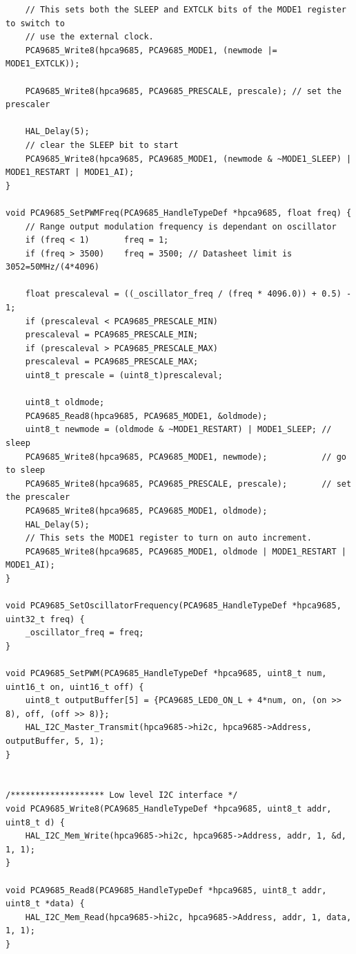 \begin{lstlisting}
    // This sets both the SLEEP and EXTCLK bits of the MODE1 register to switch to
    // use the external clock.
    PCA9685_Write8(hpca9685, PCA9685_MODE1, (newmode |= MODE1_EXTCLK));
    
    PCA9685_Write8(hpca9685, PCA9685_PRESCALE, prescale); // set the prescaler
    
    HAL_Delay(5);
    // clear the SLEEP bit to start
    PCA9685_Write8(hpca9685, PCA9685_MODE1, (newmode & ~MODE1_SLEEP) | MODE1_RESTART | MODE1_AI);
}

void PCA9685_SetPWMFreq(PCA9685_HandleTypeDef *hpca9685, float freq) {
    // Range output modulation frequency is dependant on oscillator
    if (freq < 1)       freq = 1;
    if (freq > 3500)    freq = 3500; // Datasheet limit is 3052=50MHz/(4*4096)

    float prescaleval = ((_oscillator_freq / (freq * 4096.0)) + 0.5) - 1;
    if (prescaleval < PCA9685_PRESCALE_MIN)
    prescaleval = PCA9685_PRESCALE_MIN;
    if (prescaleval > PCA9685_PRESCALE_MAX)
    prescaleval = PCA9685_PRESCALE_MAX;
    uint8_t prescale = (uint8_t)prescaleval;
    
    uint8_t oldmode;
    PCA9685_Read8(hpca9685, PCA9685_MODE1, &oldmode);
    uint8_t newmode = (oldmode & ~MODE1_RESTART) | MODE1_SLEEP; // sleep
    PCA9685_Write8(hpca9685, PCA9685_MODE1, newmode);           // go to sleep
    PCA9685_Write8(hpca9685, PCA9685_PRESCALE, prescale);       // set the prescaler
    PCA9685_Write8(hpca9685, PCA9685_MODE1, oldmode);
    HAL_Delay(5);
    // This sets the MODE1 register to turn on auto increment.
    PCA9685_Write8(hpca9685, PCA9685_MODE1, oldmode | MODE1_RESTART | MODE1_AI);
}

void PCA9685_SetOscillatorFrequency(PCA9685_HandleTypeDef *hpca9685, uint32_t freq) {
    _oscillator_freq = freq;
}

void PCA9685_SetPWM(PCA9685_HandleTypeDef *hpca9685, uint8_t num, uint16_t on, uint16_t off) {
    uint8_t outputBuffer[5] = {PCA9685_LED0_ON_L + 4*num, on, (on >> 8), off, (off >> 8)};
    HAL_I2C_Master_Transmit(hpca9685->hi2c, hpca9685->Address, outputBuffer, 5, 1);
}

            
/******************* Low level I2C interface */
void PCA9685_Write8(PCA9685_HandleTypeDef *hpca9685, uint8_t addr, uint8_t d) {
    HAL_I2C_Mem_Write(hpca9685->hi2c, hpca9685->Address, addr, 1, &d, 1, 1);
}

void PCA9685_Read8(PCA9685_HandleTypeDef *hpca9685, uint8_t addr, uint8_t *data) {
    HAL_I2C_Mem_Read(hpca9685->hi2c, hpca9685->Address, addr, 1, data, 1, 1);
}
\end{lstlisting}

